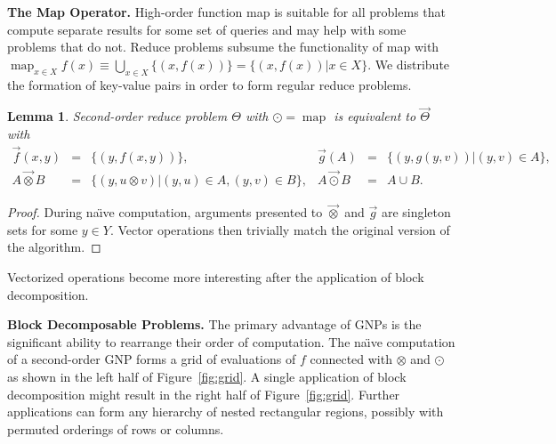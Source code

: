 \documentclass{article}
\newtheorem{lemma}{Lemma}
\newcommand{\otimesvec}{\mathbin{\overrightarrow{\otimes}}}
\newcommand{\odotvec}{\mathbin{\overrightarrow{\odot}}}
\DeclareMathOperator*{\map}{map}
\begin{document}

{\bf The Map Operator.}  High-order function map is suitable for all
problems that compute separate results for some set of queries and may
help with some problems that do not.  Reduce problems subsume the
functionality of map with $\map_{x \in X} f(x) \equiv \bigcup_{x \in
X} \{(x,f(x))\} = \{(x,f(x)) | x \in X\}$.  We distribute the
formation of key-value pairs in order to form regular reduce problems.
\begin{lemma}
  Second-order reduce problem $\Theta$ with $\odot = \map$ is
  equivalent to $\overrightarrow{\Theta}$ with
  \[ \begin{array}{rclrcl}
    \overrightarrow{f}(x,y) & = & \{(y, f(x,y))\}, & \overrightarrow{g}(A) & = & \{(y, g(y,v)) | (y,v) \in A\}, \\
    A \otimesvec B & = & \{(y, u \otimes v) | (y,u) \in A, (y,v) \in B\}, & A \odotvec B & = & A \cup B.
  \end{array} \]
\end{lemma}
\begin{proof}
  During na\"{\i}ve computation, arguments presented to $\otimesvec$
  and $\overrightarrow{g}$ are singleton sets for some $y \in Y$.
  Vector operations then trivially match the original version of the
  algorithm.
\end{proof}
\noindent Vectorized operations become more interesting after the
application of block decomposition.


{\bf Block Decomposable Problems.} The primary advantage of GNPs is
the significant ability to rearrange their order of computation.  The
na\"{\i}ve computation of a second-order GNP forms a grid of
evaluations of $f$ connected with $\otimes$ and $\odot$ as shown in
the left half of Figure~\ref{fig:grid}.  A single application of block
decomposition might result in the right half of Figure~\ref{fig:grid}.
Further applications can form any hierarchy of nested rectangular
regions, possibly with permuted orderings of rows or columns.
\end{document}
